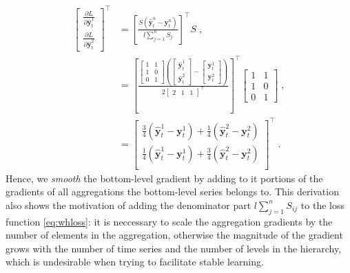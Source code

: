 \documentclass[preprint, 3p, times, twocolumn]{elsarticle}
\begin{document}
\begin{align} 
  \begin{bmatrix}
  \frac{\partial L}{\partial \hat{\textbf{y}}^1_{t}} \\
  \frac{\partial L}{\partial \hat{\textbf{y}}^2_{t}}
  \end{bmatrix}^\intercal 
  &= \left[ \frac{S(\hat{\textbf{y}}^n_{t} - \textbf{y}^n_{t})}{l \sum_{j=1}^n S_{j}} \right]^\intercal S  \;, \nonumber \\
  &=  \left[ \frac{
    \begin{bmatrix}
      1 &1 \\
      1 &0 \\
      0 &1
    \end{bmatrix}
    \left(  
    \begin{bmatrix}
      \hat{\textbf{y}}^1_{t} \\
      \hat{\textbf{y}}^2_{t}
    \end{bmatrix}  
    - 
    \begin{bmatrix}
      \textbf{y}^1_{t} \\
      \textbf{y}^2_{t}
    \end{bmatrix}  
    \right)
    }{2 
    \begin{bmatrix}
      2 &1 &1
    \end{bmatrix}^\intercal  
    } \right]^\intercal
    \begin{bmatrix}
      1 &1 \\
      1 &0 \\
      0 &1
    \end{bmatrix}  \;, \nonumber \\
  &=
  \begin{bmatrix}
    \frac{3}{4}(\hat{\textbf{y}}^1_{t} - \textbf{y}^1_{t}) + \frac{1}{4}(\hat{\textbf{y}}^2_{t} - \textbf{y}^2_{t}) \\
    \frac{1}{4}(\hat{\textbf{y}}^1_{t} - \textbf{y}^1_{t}) + \frac{3}{4}(\hat{\textbf{y}}^2_{t} - \textbf{y}^2_{t}) \\
  \end{bmatrix}^\intercal  \; \nonumber.      
\end{align}  
Hence, we \textit{smooth} the bottom-level gradient by adding to it portions of the gradients of all aggregations the bottom-level series belongs to. This derivation also shows the motivation of adding the denominator part \(l \sum_{j=1}^n S_{ij} \) to the loss function \eqref{eq:whloss}: it is neccessary to scale the aggregation gradients by the number of elements in the aggregation, otherwise the magnitude of the gradient grows with the number of time series and the number of levels in the hierarchy, which is undesirable when trying to facilitate stable learning.
  
\end{document}
